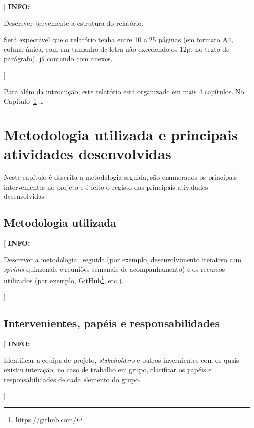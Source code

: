 \documentclass[11pt,a4paper]{report}
\newenvironment{info}[1]{\vspace*{6mm}\color{blue}[ \textbf{INFO:} \begin{em} #1}{\vspace*{3mm}\end{em} ]}
\begin{document}
\begin{info}
  Descrever brevemente a estrutura do relatório.

  Será expectável que o relatório tenha entre 10 a 25 páginas (em formato A4, coluna única, com um tamanho de letra não excedendo os 12pt no texto de parágrafo), já contando com anexos. 
\end{info}

Para além da introdução, este relatório está organizado em mais 4 capítulos.
No Capítulo~\ref{chap:metodo} \ldots


\newpage  %



\chapter{Metodologia utilizada e principais atividades desenvolvidas}\label{chap:metodo}

Neste capítulo é descrita a metodologia seguida, são enumerados os
principais intervenientes no projeto e é feito o registo das
principais atividades desenvolvidas.

\section{Metodologia utilizada}

\begin{info}
Descrever a metodologia~\parencite{despa2014comparative} seguida (por
exemplo, desenvolvimento iterativo com \emph{sprints} quinzenais e reuniões
semanais de acompanhamento) e os recursos utilizados (por exemplo,
GitHub\footnote{\url{https://github.com/}}, etc.). 
\end{info}

\section{Intervenientes, papéis e responsabilidades}

\begin{info}
Identificar a equipa de projeto, \emph{stakeholders} e outros invernientes com os quais existiu interação; no caso de trabalho em grupo, clarificar os papéis e responsabilidades de cada elemento do grupo.
\end{info}
\end{document}
